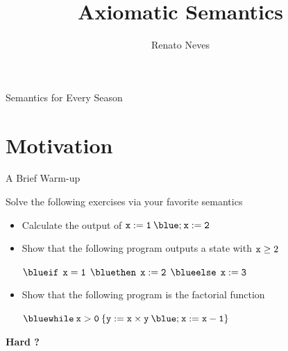 \documentclass{beamer}
\author[Renato Neves]{Renato Neves}
\date{}
\begin{document}
\title{Axiomatic Semantics}

\frame[plain]{\titlepage}


\begin{frame}{Semantics for Every Season}


\end{frame}

\section{Motivation}

\begin{frame}{A Brief Warm-up} 

        Solve the following exercises via your favorite semantics  
        \smallskip
        \begin{itemize}
                \item Calculate the output of $\prog{ x := 1 \> {\blue ;} \> x
                        := 2}$
                \\[15pt]
                \item Show that the following program outputs a state with
                $\mathtt{x} \geq 2$
                \begin{center}
                        $\prog{{\blue if} \> \> x = 1 \> \> {\blue then } \> \>
                        x := 2 \> \> {\blue else} \> \> x := 3}$
                \\[15pt]
                \end{center}
                \item Show that the following program is the factorial
                function
                \begin{center}
                        $\prog{{\blue while} \> x > 0 \> \{ y := x \times y
                        \> {\blue ;} \> x := x - 1 \} }$
                \end{center}
        \end{itemize} 

        \pause
        \bigskip
        \textbf{Hard ?}
\end{frame}
\end{document}
